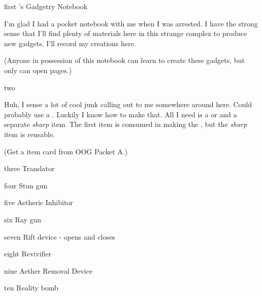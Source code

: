 \documentclass[notebook]{Silversiders} %
\begin{document}
\startnotebook{\nGadgetry{}}

\begin{page}{first}
\cIngenuity{}'s Gadgetry Notebook

I'm glad I had a pocket notebook with me when I was arrested. I have the strong sense that I'll find plenty of materials here in this strange complex to produce new gadgets. I'll record my creations here.

(Anyone in possession of this notebook can learn to create these gadgets, but only \cIngenuity{} can open pages.)
\end{page}

\begin{page}{two}

Huh, I sense a lot of cool junk calling out to me somewhere around here. Could probably use a \iLockpick{}. Luckily I know how to make that. All I need is a \iMetalShard{} or \iBrokenTrash{} and a separate \emph{sharp} item. The first item is consumed in making the \iLockpick{}, but the \emph{sharp} item is reusable.

(Get a \iLockpick{} item card from OOG Packet A.)

\end{page}

\begin{page}{three}
Translator
\end{page}

\begin{page}{four}
Stun gun
\end{page}

\begin{page}{five}
Aetheric Inhibitor
\end{page}

\begin{page}{six}
Ray gun
\end{page}

\begin{page}{seven}
Rift device - opens and closes
\end{page}

\begin{page}{eight}
Revivifier
\end{page}

\begin{page}{nine}
Aether Removal Device
\end{page}

\begin{page}{ten}
Reality bomb
\end{page}

\endnotebook
\end{document}

